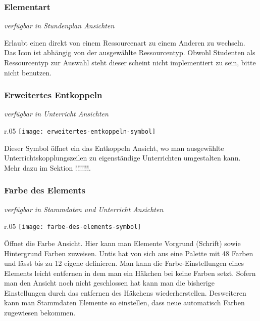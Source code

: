 \subsubsection{Elementart}
{\small\textit{verfügbar in Stundenplan Ansichten\\}\par}

\noindent
Erlaubt einen direkt von einem Ressourcenart zu einem Anderen zu wechseln. Das Icon ist abhängig von der ausgewählte Ressourcentyp. Obwohl Studenten als Ressourcentyp zur Auswahl steht dieser scheint nicht implementiert zu sein, bitte nicht benutzen.

\subsubsection{Erweitertes Entkoppeln}
{\small\textit{verfügbar in Unterricht Ansichten\\}\par}

\begin{wrapfigure}{r}{.05\textwidth}
	\vspace{-50pt}
	\texttt{[image: erweitertes-entkoppeln-symbol]}
	\vspace{-35pt}
\end{wrapfigure}

\noindent
Dieser Symbol öffnet ein das Entkoppeln Ansicht, wo man ausgewählte Unterrichtskopplungszeilen zu eigenständige Unterrichten umgestalten kann. Mehr dazu im Sektion !!!!!!!.

\subsubsection{Farbe des Elements}
{\small\textit{verfügbar in Stammdaten und Unterricht Ansichten\\}\par}

\begin{wrapfigure}{r}{.05\textwidth}
	\vspace{-50pt}
	\texttt{[image: farbe-des-elements-symbol]}
	\vspace{-35pt}
\end{wrapfigure}

\noindent
Öffnet die Farbe Ansicht. Hier kann man Elemente Vorgrund (Schrift) sowie Hintergrund Farben zuweisen. Untis hat von sich aus eine Palette mit 48 Farben und lässt bis zu 12 eigene definieren. Man kann die Farbe-Einstellungen eines Elements leicht entfernen in dem man ein Häkchen bei keine Farben setzt. Sofern man den Ansicht noch nicht geschlossen hat kann man die bisherige Einstellungen durch das entfernen des Häkchens wiederherstellen. Desweiteren kann man Stammdaten Elemente so einstellen, dass neue automatisch Farben zugewiesen bekommen.

